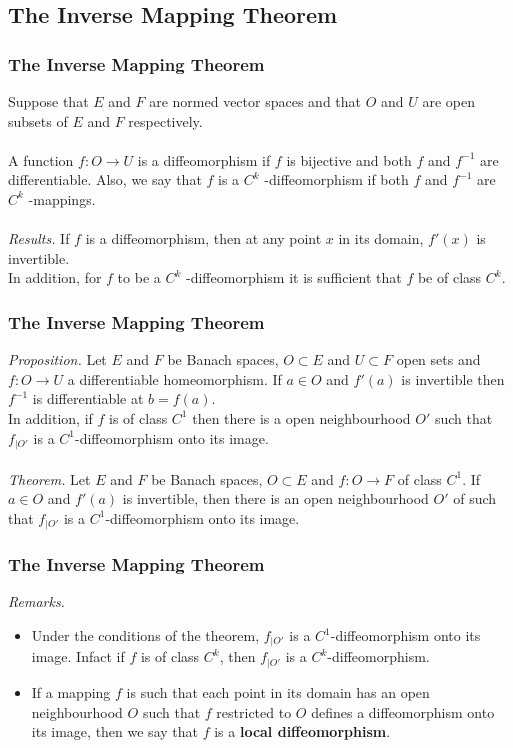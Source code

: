 \documentclass{beamer}
\begin{document}
\subsection{The Inverse Mapping Theorem}
\begin{frame}
\frametitle{The Inverse Mapping Theorem}

Suppose that $E$ and $F$ are normed vector spaces and that $O$ and $U$ are open subsets
of $E$ and $F$ respectively.\\~\\ A function $f : O \to U$ is a diffeomorphism if
$f$ is bijective and both $f$ and $f^{-1}$ are differentiable. Also, we say that $f$ is a
$C^k$ -diffeomorphism if both $f$ and $f^{-1}$ are $C^k$ -mappings. \\~\\

\textit{Results.} If $f$ is a diffeomorphism, then at any point $x$ in its domain, $f'(x)$
is invertible.\\

In addition, for $f$ to be a $C^k$ -diffeomorphism it is sufficient that $f$ be of class $C^k$.\\


\end{frame}


\begin{frame}
\frametitle{The Inverse Mapping Theorem}
\textit{Proposition.} Let $E$ and $F$ be Banach spaces, $O \subset E$ and $U \subset F$ open
sets and $f : O \to U$ a differentiable homeomorphism. If $a \in O$ and $f'(a)$ is invertible then $f^{-1}$ is differentiable at $b = f(a)$.\\
In addition, if $f$ is of class $C^1$ then there is a open neighbourhood $O'$ such that $f_{|O'}$ is a $C^1$-diffeomorphism onto its image.\\~\\

\textit{Theorem.} Let $E$ and $F$ be Banach spaces, $O \subset E$ and $f : O \to F$ of class $C^1$. If $a \in O$ and $f'(a)$ is invertible, then there is an open neighbourhood $O'$ of such that $f_{ |O'}$ is a $C^1$-diffeomorphism onto its image.


\end{frame}


\begin{frame}
\frametitle{The Inverse Mapping Theorem}
\textit{Remarks.}
\begin{itemize}
\item Under the conditions of the theorem, $f_{ |O'}$ is a $C^1$-diffeomorphism onto its image. Infact if $f$ is of class $C^k$, then $f_{ |O'}$ is a $C^k$-diffeomorphism.

\item If a mapping $f$ is such that each point in its domain has an open neighbourhood
$O$ such that $f$ restricted to $O$ defines a diffeomorphism onto its image, then we
say that $f$ is a \textbf{local diffeomorphism}.

\end{itemize} 


\end{frame}
\end{document}
